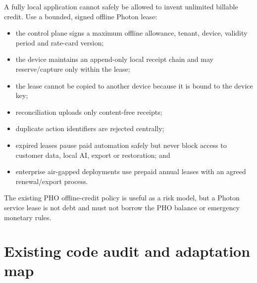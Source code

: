 \documentclass[11pt]{article}
\begin{document}
A fully local application cannot safely be allowed to invent unlimited billable credit. Use a bounded, signed offline Photon lease:

\begin{itemize}
  \item the control plane signs a maximum offline allowance, tenant, device, validity period and rate-card version;
  \item the device maintains an append-only local receipt chain and may reserve/capture only within the lease;
  \item the lease cannot be copied to another device because it is bound to the device key;
  \item reconciliation uploads only content-free receipts;
  \item duplicate action identifiers are rejected centrally;
  \item expired leases pause paid automation safely but never block access to customer data, local AI, export or restoration; and
  \item enterprise air-gapped deployments use prepaid annual leases with an agreed renewal/export process.
\end{itemize}

The existing PHO offline-credit policy is useful as a risk model, but a Photon service lease is not debt and must not borrow the PHO balance or emergency monetary rules.

\section{Existing code audit and adaptation map}
\end{document}
